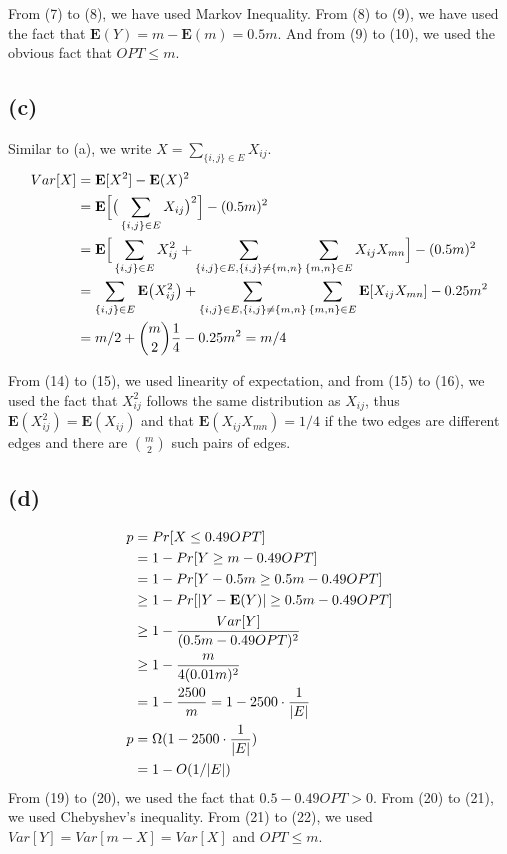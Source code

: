 \documentclass[11pt]{537homework}
\begin{document}
From (7) to (8), we have used Markov Inequality. From (8) to (9), we have used the fact that $\mathbf{E}(Y) = m - \mathbf{E}(m) = 0.5m$. And from (9) to (10), we used the obvious fact that $OPT \leq m$. 


\subsection*{(c)}

Similar to (a), we write $X = \sum_{\{i, j\} \in E}X_{ij}$. 
\begin{align}
  Var[X]      & = \mathbf{E}[X^2] - \mathbf{E}(X)^2 \\
              & = \mathbf{E}\Big[\big(\sum_{\{i, j\} \in E}X_{ij} \big)^2\Big] - (0.5m)^2 \\
              & =  \mathbf{E}\Big[\sum_{\{i, j\} \in E}X_{ij}^2 + \sum_{\{i,j\} \in E, \{i, j\} \neq \{m, n\}}\sum_{\{m,n\} \in E}X_{ij}X_{mn}\Big] - (0.5m)^2 \\
              & = \sum_{\{i, j\} \in E} \mathbf{E}\big(X_{ij}^2\big) + \sum_{\{i,j\} \in E, \{i, j\} \neq \{m, n\}}\sum_{\{m,n\} \in E} \mathbf{E}[X_{ij}X_{mn}] - 0.25m^2 \\
              & = m/2 + {m \choose 2}{1\over 4} - 0.25m^2 = m/4
\end{align}

From (14) to (15), we used linearity of expectation, and from (15) to (16), we used the fact that $X_{ij}^2$ follows the same distribution as $X_{ij}$, thus $\mathbf{E}(X_{ij}^2) = \mathbf{E}(X_{ij})$ and that $\mathbf{E}(X_{ij}X_{mn}) = 1/4$ if the two edges are different edges and there are ${m \choose 2}$ such pairs of edges. 


\subsection*{(d)}
\proof 
\begin{align}
  p                     & = Pr[X \leq 0.49 OPT] \\
                        & = 1 - Pr[Y \geq m - 0.49 OPT] \\
                        & = 1 - Pr[Y - 0.5m \geq 0.5m - 0.49 OPT] \\
                        & \geq 1 - Pr[|Y - \mathbf{E}(Y)| \geq 0.5m - 0.49 OPT] \\
                        & \geq 1 - {Var[Y] \over (0.5m - 0.49 OPT)^2} \\
                        & \geq 1 - {m \over 4 (0.01m)^2} \\
                        & = 1 - {2500 \over m} = 1 - 2500 \cdot {1 \over |E|} \\
 p                      & = \Omega(1 - 2500 \cdot {1 \over |E|} ) \\
                        & = 1 - O(1/|E|)
\end{align}
From (19) to (20), we used the fact that $0.5 - 0.49 OPT > 0$. From (20) to (21), we used Chebyshev's inequality. From (21) to (22), we used $Var[Y] = Var[m-X] = Var[X]$ and $OPT \leq m$. 
\end{document}
